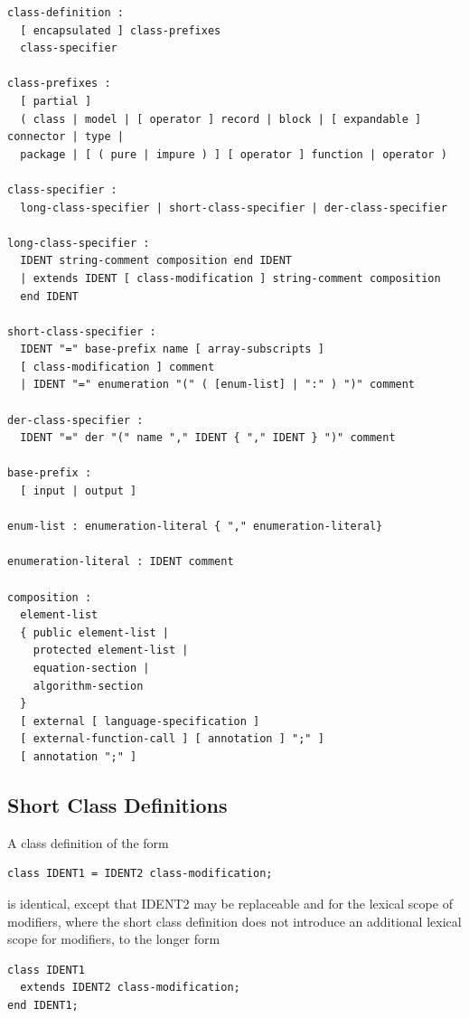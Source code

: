 \documentclass[10pt,a4paper]{report}
\def\doublelabel#1{\label{#1}\hypertarget{#1}{}}
\begin{document}
\begin{lstlisting}[language=grammar]
class-definition :
  [ encapsulated ] class-prefixes  
  class-specifier
  
class-prefixes :
  [ partial ]
  ( class | model | [ operator ] record | block | [ expandable ] connector | type |
  package | [ ( pure | impure ) ] [ operator ] function | operator )
  
class-specifier :
  long-class-specifier | short-class-specifier | der-class-specifier

long-class-specifier :
  IDENT string-comment composition end IDENT
  | extends IDENT [ class-modification ] string-comment composition
  end IDENT
  
short-class-specifier :
  IDENT "=" base-prefix name [ array-subscripts ]
  [ class-modification ] comment
  | IDENT "=" enumeration "(" ( [enum-list] | ":" ) ")" comment
  
der-class-specifier :
  IDENT "=" der "(" name "," IDENT { "," IDENT } ")" comment
  
base-prefix :
  [ input | output ]
  
enum-list : enumeration-literal { "," enumeration-literal}

enumeration-literal : IDENT comment

composition :
  element-list
  { public element-list |
    protected element-list |
    equation-section |
    algorithm-section
  }
  [ external [ language-specification ]
  [ external-function-call ] [ annotation ] ";" ]
  [ annotation ";" ]
\end{lstlisting}

\subsection{Short Class Definitions}\doublelabel{short-class-definitions}

A class definition of the form
\begin{lstlisting}[language=modelica]
class IDENT1 = IDENT2 class-modification;
\end{lstlisting}

is identical, except that IDENT2 may be replaceable and for the lexical
scope of modifiers, where the short class definition does not introduce
an additional lexical scope for modifiers, to the longer form

\begin{lstlisting}[language=modelica]
class IDENT1
  extends IDENT2 class-modification;
end IDENT1;
\end{lstlisting}
\end{document}

